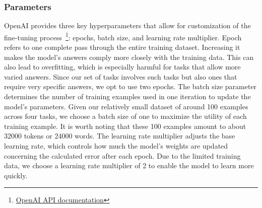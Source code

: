 \subsubsection{Parameters}
OpenAI provides three key hyperparameters that allow for customization of the fine-tuning process~\footnote{\href{https://platform.openai.com/docs/api-reference/fine-tuning/create\#fine-tuning-create-hyperparameters}{OpenAI API documentation}}: epochs, batch size, and learning rate multiplier. Epoch refers to one complete pass through the entire training dataset. Increasing it makes the model's answers comply more closely with the training data. This can also lead to overfitting, which is especially harmful for tasks that allow more varied answers. Since our set of tasks involves such tasks but also ones that require very specific answers, we opt to use two epochs. The batch size parameter determines the number of training examples used in one iteration to update the model’s parameters. Given our relatively small dataset of around 100 examples across four tasks, we choose a batch size of one to maximize the utility of each training example. It is worth noting that these 100 examples amount to about 32000 tokens or 24000 words. The learning rate multiplier adjusts the base learning rate, which controls how much the model’s weights are updated concerning the calculated error after each epoch. Due to the limited training data, we choose a learning rate multiplier of 2 to enable the model to learn more quickly. 

